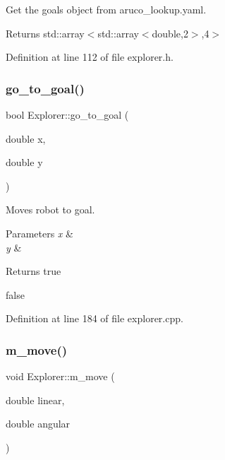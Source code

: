 Get the goals object from aruco\+\_\+lookup.\+yaml. 

\begin{DoxyReturn}{Returns}
std\+::array$<$std\+::array$<$double,2$>$,4$>$ 
\end{DoxyReturn}


Definition at line 112 of file explorer.\+h.

\mbox{\label{class_explorer_aa1e259feaac1114adb0f24588428e8ef}} 
\subsubsection{\texorpdfstring{go\+\_\+to\+\_\+goal()}{go\_to\_goal()}}
{\footnotesize\ttfamily bool Explorer\+::go\+\_\+to\+\_\+goal (\begin{DoxyParamCaption}\item[{double}]{x,  }\item[{double}]{y }\end{DoxyParamCaption})}



Moves robot to goal. 


\begin{DoxyParams}{Parameters}
{\em x} & \\
\hline
{\em y} & \\
\hline
\end{DoxyParams}
\begin{DoxyReturn}{Returns}
true 

false 
\end{DoxyReturn}


Definition at line 184 of file explorer.\+cpp.

\mbox{\label{class_explorer_ace304ef65547f4a3ff6458d934c54e87}} 
\subsubsection{\texorpdfstring{m\+\_\+move()}{m\_move()}}
{\footnotesize\ttfamily void Explorer\+::m\+\_\+move (\begin{DoxyParamCaption}\item[{double}]{linear,  }\item[{double}]{angular }\end{DoxyParamCaption})}




